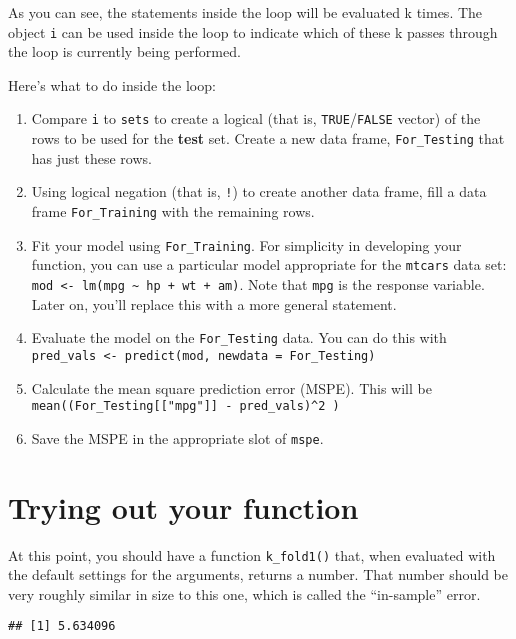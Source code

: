 \documentclass[]{tufte-handout}
\providecommand{\tightlist}{%
  \setlength{\itemsep}{0pt}\setlength{\parskip}{0pt}}
\begin{document}
As you can see, the statements inside the loop will be evaluated k
times. The object \texttt{i} can be used inside the loop to indicate
which of these k passes through the loop is currently being performed.

Here's what to do inside the loop:

\begin{enumerate}
\def\labelenumi{\arabic{enumi}.}
\tightlist
\item
  Compare \texttt{i} to \texttt{sets} to create a logical (that is,
  \texttt{TRUE}/\texttt{FALSE} vector) of the rows to be used for the
  \textbf{test} set. Create a new data frame, \texttt{For\_Testing} that
  has just these rows.
\item
  Using logical negation (that is, \texttt{!}) to create another data
  frame, fill a data frame \texttt{For\_Training} with the remaining
  rows.
\item
  Fit your model using \texttt{For\_Training}. For simplicity in
  developing your function, you can use a particular model appropriate
  for the \texttt{mtcars} data set:
  \texttt{mod\ \textless{}-\ lm(mpg\ \textasciitilde{}\ hp\ +\ wt\ +\ am)}.
  Note that \texttt{mpg} is the response variable. Later on, you'll
  replace this with a more general statement.
\item
  Evaluate the model on the \texttt{For\_Testing} data. You can do this
  with
  \texttt{pred\_vals\ \textless{}-\ predict(mod,\ newdata\ =\ For\_Testing)}
\item
  Calculate the mean square prediction error (MSPE). This will be
  \texttt{mean((For\_Testing{[}{[}"mpg"{]}{]}\ -\ pred\_vals)\^{}2\ )}
\item
  Save the MSPE in the appropriate slot of \texttt{mspe}.
\end{enumerate}

\section{Trying out your function}\label{trying-out-your-function}

At this point, you should have a function \texttt{k\_fold1()} that, when
evaluated with the default settings for the arguments, returns a number.
That number should be very roughly similar in size to this one, which is
called the ``in-sample'' error.

\begin{verbatim}
## [1] 5.634096
\end{verbatim}
\end{document}

